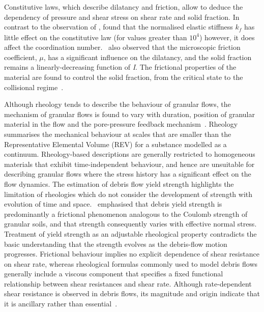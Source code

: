 
Constitutive laws, which describe dilatancy and friction, allow to 
deduce the dependency of pressure and shear stress on shear rate and solid 
fraction. In contrast to the observation of \citet{Campbell2002}, 
\citet{DaCruz2005} found that the normalised elastic stiffness $\mathit{k_f}$ 
has little effect on the constitutive law (for values greater than $10^{4}$) 
however, it does affect the coordination number.~\citet{DaCruz2005} also 
observed that the microscopic friction coefficient, $\mu$, has a significant 
influence on the dilatancy, and the solid fraction remains a 
linearly-decreasing function of \textit{I}. The 
frictional properties of the material are found to control the solid fraction, 
from the critical state to the collisional regime~\citep{DaCruz2005}. 

Although rheology tends to describe the behaviour of granular flows, the 
mechanism of granular flows is found to vary with duration, position of 
granular material in the flow and the pore-pressure feedback 
mechanism~\citep{Iverson2003}. Rheology summarises the mechanical behaviour at 
scales that are smaller than the Representative Elemental Volume (REV) 
for a substance modelled as a continuum. Rheology-based descriptions are 
generally restricted to homogeneous materials that exhibit time-independent 
behaviour, and hence are unsuitable for describing granular flows where the 
stress 
history has a significant effect on the flow dynamics. The estimation of debris 
flow yield strength highlights the limitation of rheologies which do not 
consider the development of strength with evolution of time and 
space.~\citet{Johnson1965} emphasised that debris yield strength is 
predominantly a frictional phenomenon analogous to the Coulomb strength of 
granular soils, and that strength consequently varies with effective normal 
stress. Treatment of yield strength as an adjustable rheological property 
contradicts the basic understanding that the strength evolves as the 
debris-flow motion progresses. Frictional behaviour implies no explicit 
dependence of shear resistance on shear rate, whereas rheological formulas 
commonly used to model debris flows generally include a viscous component that 
specifies a fixed functional relationship between shear resistances and shear 
rate. Although rate-dependent shear resistance is observed in debris flows, its 
magnitude and origin indicate that it is ancillary rather than 
essential~\citep{Iverson2003}.

